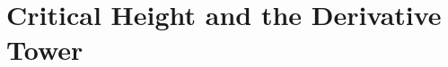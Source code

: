 
\clearpage
\section{Critical Height and the Derivative Tower}\label{sec:CriticalHeightAndDerivativeTower}




